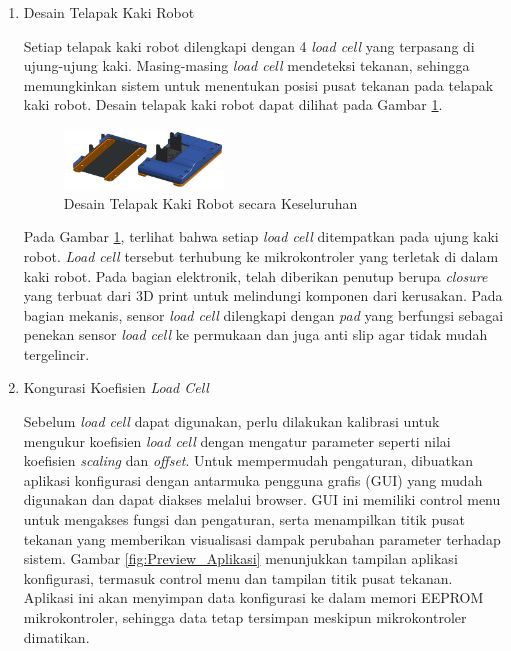 \begin{enumerate}[label=\Alph*.]
    \item Desain Telapak Kaki Robot
    \label{subsec:desainsistemloadcell}

    \hspace*{1em} Setiap telapak kaki robot dilengkapi dengan 4 \emph{load cell} yang terpasang di ujung-ujung kaki. Masing-masing \emph{load cell} mendeteksi tekanan, sehingga memungkinkan sistem untuk menentukan posisi pusat tekanan pada telapak kaki robot. Desain telapak kaki robot dapat dilihat pada Gambar \ref{fig:Desain_Kaki}.
    
    \begin{figure} [h] \centering
      \includegraphics[width=0.4\textwidth]{gambar/Desain_Kaki.png}
      \caption{Desain Telapak Kaki Robot secara Keseluruhan}
      \label{fig:Desain_Kaki}
    \end{figure}

    \hspace*{1em} Pada Gambar \ref{fig:Desain_Kaki}, terlihat bahwa setiap \emph{load cell} ditempatkan pada ujung kaki robot. \emph{Load cell} tersebut terhubung ke mikrokontroler yang terletak di dalam kaki robot. Pada bagian elektronik, telah diberikan penutup berupa \textit{closure} yang terbuat dari 3D print untuk melindungi komponen dari kerusakan. Pada bagian mekanis, sensor \emph{load cell} dilengkapi dengan \textit{pad} yang berfungsi sebagai penekan sensor \emph{load cell} ke permukaan dan juga anti slip agar tidak mudah tergelincir.  

    \item Kongurasi Koefisien \emph{Load Cell}
    \label{subsec:konfigurasikoefisien}

    \hspace*{1em} Sebelum \emph{load cell} dapat digunakan, perlu dilakukan kalibrasi untuk mengukur koefisien \emph{load cell} dengan mengatur parameter seperti nilai koefisien \textit{scaling} dan \textit{offset}. Untuk mempermudah pengaturan, dibuatkan aplikasi konfigurasi dengan antarmuka pengguna grafis (GUI) yang mudah digunakan dan dapat diakses melalui browser. GUI ini memiliki control menu untuk mengakses fungsi dan pengaturan, serta menampilkan titik pusat tekanan yang memberikan visualisasi dampak perubahan parameter terhadap sistem. Gambar \ref{fig:Preview_Aplikasi} menunjukkan tampilan aplikasi konfigurasi, termasuk control menu dan tampilan titik pusat tekanan. Aplikasi ini akan menyimpan data konfigurasi ke dalam memori EEPROM mikrokontroler, sehingga data tetap tersimpan meskipun mikrokontroler dimatikan.


\end{enumerate}
